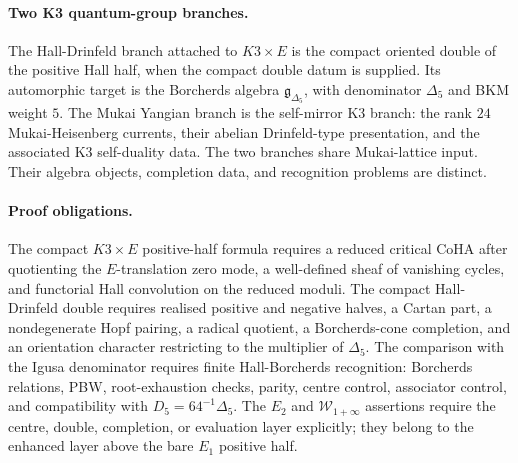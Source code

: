 \paragraph{Two K3 quantum-group branches.}
The Hall-Drinfeld branch attached to \(K3\times E\) is the compact
oriented double of the positive Hall half, when the compact double datum
is supplied.  Its automorphic target is the Borcherds algebra
\(\mathfrak g_{\Delta_5}\), with denominator \(\Delta_5\) and BKM
weight \(5\).  The Mukai Yangian branch is the self-mirror K3 branch:
the rank \(24\) Mukai-Heisenberg currents, their abelian
Drinfeld-type presentation, and the associated K3 self-duality data.
The two branches share Mukai-lattice input.  Their algebra objects,
completion data, and recognition problems are distinct.

\paragraph{Proof obligations.}
The compact \(K3\times E\) positive-half formula requires a reduced
critical CoHA after quotienting the \(E\)-translation zero mode, a
well-defined sheaf of vanishing cycles, and functorial Hall convolution on
the reduced moduli.  The compact Hall-Drinfeld double requires realised
positive and negative halves, a Cartan part, a nondegenerate Hopf
pairing, a radical quotient, a Borcherds-cone completion, and an
orientation character restricting to the multiplier of \(\Delta_5\).
The comparison with the Igusa denominator requires finite
Hall-Borcherds recognition: Borcherds relations, PBW, root-exhaustion
checks, parity, centre control, associator control, and compatibility
with \(D_5=64^{-1}\Delta_5\).  The \(E_2\) and
\(\mathcal W_{1+\infty}\) assertions require the centre, double,
completion, or evaluation layer explicitly; they belong to the enhanced
layer above the bare \(E_1\) positive half.
